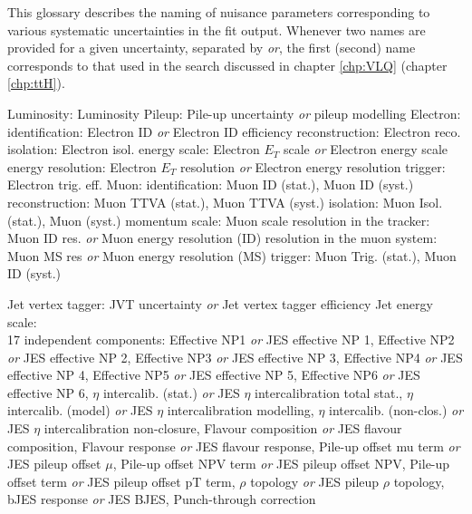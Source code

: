 This glossary describes the naming of nuisance parameters corresponding to various systematic uncertainties in the fit output.
Whenever two names are provided for a given uncertainty, separated by {\sl or}, the first (second) name corresponds to that used in the search discussed in chapter \ref{chp:VLQ} (chapter \ref{chp:ttH}).

\bi
\ib Luminosity: Luminosity
\ib Pileup: Pile-up uncertainty \emph{or} pileup modelling
\ib Electron: 
\bi
\ib identification: Electron ID \emph{or} Electron ID efficiency
\ib reconstruction: Electron reco.
\ib isolation: Electron isol.
\ib energy scale: Electron $E_T$ scale \emph{or} Electron energy scale
\ib energy resolution: Electron $E_T$ resolution \emph{or} Electron energy resolution
\ib trigger: Electron trig. eff.
\ei
\ib Muon:
\bi
\ib identification: Muon ID (stat.), Muon ID (syst.)
\ib reconstruction: Muon TTVA (stat.), Muon TTVA (syst.)
\ib isolation: Muon Isol. (stat.), Muon (syst.)
\ib momentum scale: Muon \pt scale
\ib resolution in the tracker: Muon ID \pt res. \emph{or} Muon energy resolution (ID)
\ib resolution in the muon system: Muon MS \pt res \emph{or} Muon energy resolution (MS)
\ib trigger: Muon Trig. (stat.), Muon ID (syst.)
\ei

\ib Jet vertex tagger: JVT uncertainty \emph{or} Jet vertex tagger efficiency
\ib Jet energy scale:\\ 17 independent components: Effective NP1 \emph{or} JES effective NP 1, Effective NP2 \emph{or} JES effective NP 2, Effective NP3 \emph{or} JES effective NP 3, Effective NP4 \emph{or} JES effective NP 4, Effective NP5 \emph{or} JES effective NP 5, Effective NP6 \emph{or} JES effective NP 6, $\eta$ intercalib. (stat.) \emph{or} JES $\eta$ intercalibration total stat., $\eta$ intercalib. (model) \emph{or} JES $\eta$ intercalibration modelling, $\eta$ intercalib. (non-clos.) \emph{or} JES $\eta$ intercalibration non-closure, Flavour composition \emph{or} JES flavour composition, Flavour response \emph{or} JES flavour response, Pile-up offset mu term \emph{or} JES pileup offset $\mu$, Pile-up offset NPV term \emph{or} JES pileup offset NPV, Pile-up offset \pt term \emph{or} JES pileup offset pT term, $\rho$ topology \emph{or} JES pileup $\rho$ topology, bJES response \emph{or} JES BJES, Punch-through correction

